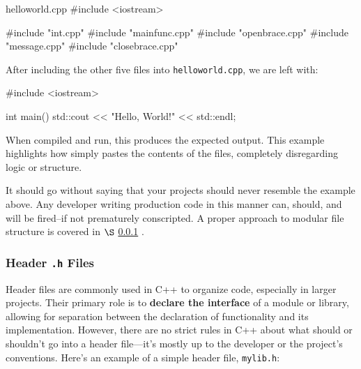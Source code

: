 \documentclass[12pt]{article}
\begin{document}
\begin{cxx}{closebrace.cpp}
}
\end{cxx}

\begin{cxx}{helloworld.cpp}
#include <iostream>

#include "int.cpp"
#include "mainfunc.cpp"
#include "openbrace.cpp"
#include "message.cpp"
#include "closebrace.cpp"
\end{cxx}


\begin{explanation}
After including the other five files into \texttt{helloworld.cpp}, we are left with:

\begin{cxx}{}
#include <iostream>

int
main()
{
std::cout << "Hello, World!" << std::endl;
}
\end{cxx}

\noindent
When compiled and run, this produces the expected output. This example highlights how  simply pastes the contents of the files, completely disregarding logic or structure.
\end{explanation}

\noindent
It should go without saying that your projects should never resemble the example above.
Any developer writing production code in this manner can, should, and will be fired--if not prematurely conscripted.
A proper approach to modular file structure is covered in $\S$ \ref{sec:header-files} .

\subsubsection{Header \texttt{.h} Files}
\label{sec:header-files}

\noindent
Header files are commonly used in C++ to organize code, especially in larger projects.
Their primary role is to \textbf{declare the interface} of a module or library, allowing for separation between the declaration of functionality and its implementation.
However, there are no strict rules in C++ about what should or shouldn't go into a header file—it's mostly up to the developer or the project's conventions.
Here's an example of a simple header file, \texttt{mylib.h}:
\end{document}
